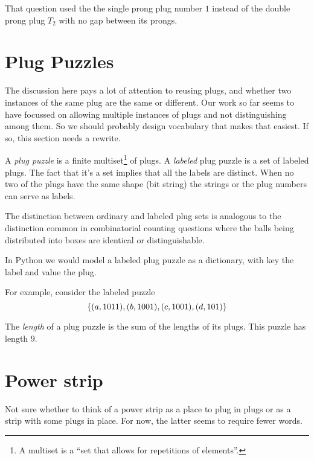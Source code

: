 \documentclass[10pt]{article}
\numberwithin{equation}{section}
\newenvironment{anote}
               {{\textcolor{blue}{Note:}}
                 \itshape
               }
               {}
\newcommand{\plug}[1]{%
\mbox{{\textbf\texttt #1}}
}
\begin{document}
That question used the the single prong plug number $1$ instead of the
double prong plug $T_2$ with no gap between its prongs.

\section{Plug Puzzles}

\begin{anote}
The discussion here pays a lot of attention to reusing plugs,
  and whether two instances of the same plug are the same or
  different. Our work so far seems to have focussed on allowing
  multiple instances of plugs and not distinguishing among them. So we
  should probably design vocabulary that makes that easiest. If so,
  this section needs a rewrite.
\end{anote}

A \emph{plug puzzle} is a finite multiset\footnote{A multiset is a
  ``set that allows for repetitions of elements''.}
 of plugs. A \emph{labeled} plug puzzle is a set of labeled
 plugs. The fact that it's a set implies that all the labels are
 distinct. When no two of the plugs have the same shape (bit string)
 the strings or the plug numbers can serve as labels.

 The distinction between ordinary and labeled plug sets is analogous
 to the distinction common in combinatorial counting questions where
 the balls being distributed into boxes are identical or
 distinguishable.

 In Python we would model a labeled plug puzzle as a dictionary, with
 key the label and value the plug.

 For example, consider the labeled puzzle
 \begin{equation*}
   \{ (a, \plug{1011}),
   (b,\plug{1001}),
   (c, \plug{1001}),
   (d, \plug{101}) \}
\end{equation*}

 The \emph{length} of a plug puzzle is the sum of the lengths of its
 plugs. This puzzle has length $9$.
 
 \section{Power strip}

 \begin{anote}
Not sure whether to think of a power strip as a place to plug
 in plugs or as a strip with some plugs in place. For now, the latter
 seems to require fewer words.
\end{anote}
\end{document}
